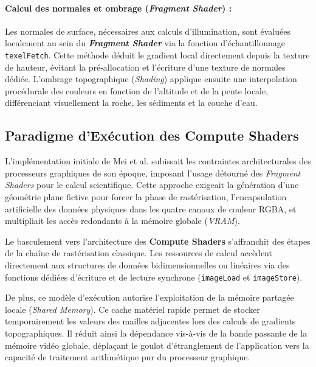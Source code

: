\documentclass[10pt,twocolumn,a4paper]{article}
\begin{document}
\paragraph{Calcul des normales et ombrage (\textit{Fragment Shader}) :}
Les normales de surface, nécessaires aux calculs d'illumination, sont évaluées localement au sein du \textbf{\textit{Fragment Shader}} via la fonction d'échantillonnage \texttt{texelFetch}. Cette méthode déduit le gradient local directement depuis la texture de hauteur, évitant la pré-allocation et l'écriture d'une texture de normales dédiée. L'ombrage topographique (\textit{Shading}) applique ensuite une interpolation procédurale des couleurs en fonction de l'altitude et de la pente locale, différenciant visuellement la roche, les sédiments et la couche d'eau.

\subsection{Paradigme d'Exécution des Compute Shaders}\label{subsec:paradigme_compute}
L'implémentation initiale de Mei et al. \cite{MDH07} subissait les contraintes architecturales des processeurs graphiques de son époque, imposant l'usage détourné des \textit{Fragment Shaders} pour le calcul scientifique. Cette approche exigeait la génération d'une géométrie plane fictive pour forcer la phase de rastérisation, l'encapsulation artificielle des données physiques dans les quatre canaux de couleur RGBA, et multipliait les accès redondants à la mémoire globale (\textit{VRAM}).

Le basculement vers l'architecture des \textbf{Compute Shaders} s'affranchit des étapes de la chaîne de rastérisation classique. Les ressources de calcul accèdent directement aux structures de données bidimensionnelles ou linéaires via des fonctions dédiées d'écriture et de lecture synchrone (\texttt{imageLoad} et \texttt{imageStore}).

De plus, ce modèle d'exécution autorise l'exploitation de la mémoire partagée locale (\textit{Shared Memory}). Ce cache matériel rapide permet de stocker temporairement les valeurs des mailles adjacentes lors des calculs de gradients topographiques. Il réduit ainsi la dépendance vis-à-vis de la bande passante de la mémoire vidéo globale, déplaçant le goulot d'étranglement de l'application vers la capacité de traitement arithmétique pur du processeur graphique.

\end{document}
